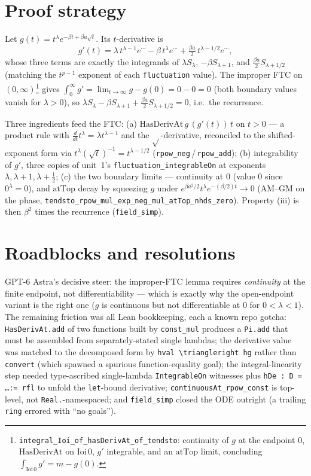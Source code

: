 \documentclass[11pt]{article}
\begin{document}
\section{Proof strategy}
Let $g(t)=t^\lambda e^{-\beta t+\beta a\sqrt t}$. Its $t$-derivative is
\[
g'(t)=\lambda\,t^{\lambda-1}e^{\cdots}-\beta\,t^{\lambda}e^{\cdots}+\tfrac{\beta a}{2}\,t^{\lambda-1/2}e^{\cdots},
\]
whose three terms are exactly the integrands of $\lambda S_\lambda$, $-\beta S_{\lambda+1}$, and
$\tfrac{\beta a}{2}S_{\lambda+1/2}$ (matching the $t^{p-1}$ exponent of each \texttt{fluctuation}
value). The improper FTC on $(0,\infty)$\footnote{\texttt{integral\_Ioi\_of\_hasDerivAt\_of\_tendsto}:
continuity of $g$ at the endpoint $0$, $\mathrm{HasDerivAt}$ on $\mathrm{Ioi}\,0$, $g'$ integrable,
and an $\mathrm{atTop}$ limit, concluding $\int_{\mathrm{Ioi}\,0}g'=m-g(0)$.} gives
$\int_0^\infty g'=\lim_{t\to\infty}g-g(0)=0-0=0$ (both boundary values vanish for $\lambda>0$), so
$\lambda S_\lambda-\beta S_{\lambda+1}+\tfrac{\beta a}{2}S_{\lambda+1/2}=0$, i.e.\ the recurrence.

Three ingredients feed the FTC: (a) $\mathrm{HasDerivAt}\,g\,(g'(t))\,t$ on $t>0$ --- a product rule
with $\tfrac{d}{dt}t^\lambda=\lambda t^{\lambda-1}$ and the $\sqrt{}$-derivative, reconciled to the
shifted-exponent form via $t^\lambda(\sqrt t)^{-1}=t^{\lambda-1/2}$
(\texttt{rpow\_neg}\,/\,\texttt{rpow\_add}); (b) integrability of $g'$, three copies of unit~1's
\texttt{fluctuation\_integrableOn} at exponents $\lambda,\lambda+1,\lambda+\tfrac12$; (c) the two
boundary limits --- continuity at $0$ (value $0$ since $0^\lambda=0$), and $\mathrm{atTop}$ decay by
squeezing $g$ under $e^{\beta a^2/2}t^\lambda e^{-(\beta/2)t}\to0$ (AM--GM on the phase,
\texttt{tendsto\_rpow\_mul\_exp\_neg\_mul\_atTop\_nhds\_zero}). Property (iii) is then $\beta^2$ times
the recurrence (\texttt{field\_simp}).

\section{Roadblocks and resolutions}
GPT-6 Astra's decisive steer: the improper-FTC lemma requires \emph{continuity} at the finite
endpoint, not differentiability --- which is exactly why the open-endpoint variant is the right one
($g$ is continuous but not differentiable at $0$ for $0<\lambda<1$). The remaining friction was all
Lean bookkeeping, each a known repo gotcha: \texttt{HasDerivAt.add} of two functions built by
\texttt{const\_mul} produces a \texttt{Pi.add} that must be assembled from separately-stated single
lambdas; the derivative value was matched to the decomposed form by \texttt{hval\,{\textbackslash}triangleright\,hg}
rather than \texttt{convert} (which spawned a spurious function-equality goal); the integral-linearity
step needed type-ascribed single-lambda \texttt{IntegrableOn} witnesses plus \texttt{hDe : D = \ldots := rfl}
to unfold the \texttt{let}-bound derivative; \texttt{continuousAt\_rpow\_const} is top-level, not
\texttt{Real.}-namespaced; and \texttt{field\_simp} closed the ODE outright (a trailing \texttt{ring}
errored with ``no goals'').
\end{document}
